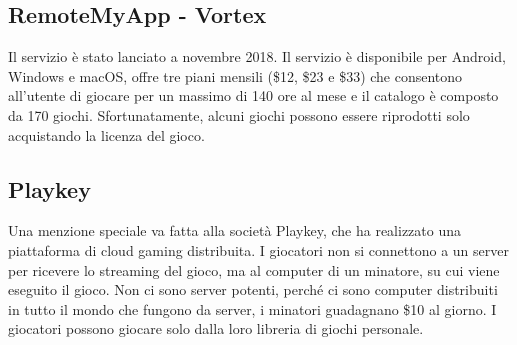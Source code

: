 \subsection{RemoteMyApp - Vortex}
Il servizio è stato lanciato a novembre 2018. Il servizio è disponibile per Android, Windows e macOS, offre tre piani mensili (\$12, \$23 e \$33) che consentono all'utente di giocare per un massimo di 140 ore al mese e il catalogo è composto da 170 giochi. Sfortunatamente, alcuni giochi possono essere riprodotti solo acquistando la licenza del gioco\cite{RemoteMyApp_Vortex}.

\subsection{Playkey}
Una menzione speciale va fatta alla società Playkey, che ha realizzato una piattaforma di cloud gaming distribuita. I giocatori non si connettono a un server per ricevere lo streaming del gioco, ma al computer di un minatore, su cui viene eseguito il gioco. Non ci sono server potenti, perché ci sono computer distribuiti in tutto il mondo che fungono da server, i minatori guadagnano \$10 al giorno. I giocatori possono giocare solo dalla loro libreria di giochi personale\cite{Playkey}.
